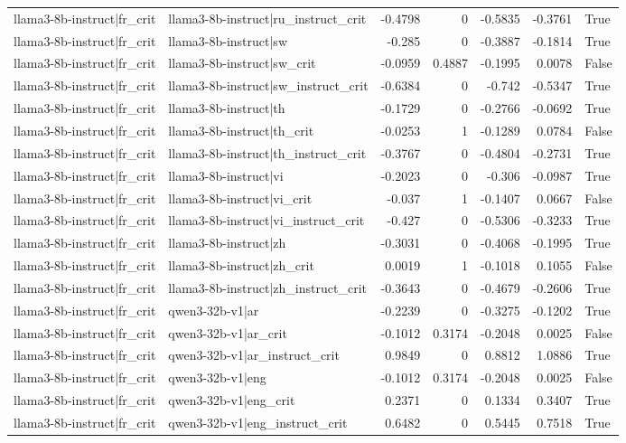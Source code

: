 \begin{table}
\begin{tabular}{l l r r r r l}
llama3-8b-instruct|fr_crit & llama3-8b-instruct|ru_instruct_crit & -0.4798 & 0 & -0.5835 & -0.3761 & True \\
llama3-8b-instruct|fr_crit & llama3-8b-instruct|sw & -0.285 & 0 & -0.3887 & -0.1814 & True \\
llama3-8b-instruct|fr_crit & llama3-8b-instruct|sw_crit & -0.0959 & 0.4887 & -0.1995 & 0.0078 & False \\
llama3-8b-instruct|fr_crit & llama3-8b-instruct|sw_instruct_crit & -0.6384 & 0 & -0.742 & -0.5347 & True \\
llama3-8b-instruct|fr_crit & llama3-8b-instruct|th & -0.1729 & 0 & -0.2766 & -0.0692 & True \\
llama3-8b-instruct|fr_crit & llama3-8b-instruct|th_crit & -0.0253 & 1 & -0.1289 & 0.0784 & False \\
llama3-8b-instruct|fr_crit & llama3-8b-instruct|th_instruct_crit & -0.3767 & 0 & -0.4804 & -0.2731 & True \\
llama3-8b-instruct|fr_crit & llama3-8b-instruct|vi & -0.2023 & 0 & -0.306 & -0.0987 & True \\
llama3-8b-instruct|fr_crit & llama3-8b-instruct|vi_crit & -0.037 & 1 & -0.1407 & 0.0667 & False \\
llama3-8b-instruct|fr_crit & llama3-8b-instruct|vi_instruct_crit & -0.427 & 0 & -0.5306 & -0.3233 & True \\
llama3-8b-instruct|fr_crit & llama3-8b-instruct|zh & -0.3031 & 0 & -0.4068 & -0.1995 & True \\
llama3-8b-instruct|fr_crit & llama3-8b-instruct|zh_crit & 0.0019 & 1 & -0.1018 & 0.1055 & False \\
llama3-8b-instruct|fr_crit & llama3-8b-instruct|zh_instruct_crit & -0.3643 & 0 & -0.4679 & -0.2606 & True \\
llama3-8b-instruct|fr_crit & qwen3-32b-v1|ar & -0.2239 & 0 & -0.3275 & -0.1202 & True \\
llama3-8b-instruct|fr_crit & qwen3-32b-v1|ar_crit & -0.1012 & 0.3174 & -0.2048 & 0.0025 & False \\
llama3-8b-instruct|fr_crit & qwen3-32b-v1|ar_instruct_crit & 0.9849 & 0 & 0.8812 & 1.0886 & True \\
llama3-8b-instruct|fr_crit & qwen3-32b-v1|eng & -0.1012 & 0.3174 & -0.2048 & 0.0025 & False \\
llama3-8b-instruct|fr_crit & qwen3-32b-v1|eng_crit & 0.2371 & 0 & 0.1334 & 0.3407 & True \\
llama3-8b-instruct|fr_crit & qwen3-32b-v1|eng_instruct_crit & 0.6482 & 0 & 0.5445 & 0.7518 & True \\

\end{tabular}
\end{table}
